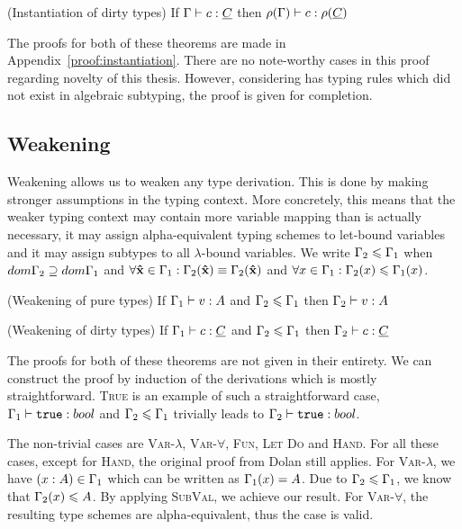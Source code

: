 \begin{theorem}
\label{thm:instantiation:drty}
(Instantiation of dirty types) If $\Gamma \vdash c \mathrel{:} \underline{C}$ then $\rho(\Gamma) \vdash c \mathrel{:} \rho(\underline{C})$
\end{theorem}
The proofs for both of these theorems are made in Appendix~\ref{proof:instantiation}. There are no note-worthy cases in this proof regarding novelty of this thesis. However, considering \core has typing rules which did not exist in algebraic subtyping, the proof is given for completion.

\subsection{Weakening}
Weakening allows us to weaken any type derivation. This is done by making stronger assumptions in the typing context. More concretely, this means that the weaker typing context may contain more variable mapping than is actually necessary, it may assign alpha-equivalent typing schemes to let-bound variables and it may assign subtypes to all $\lambda$-bound variables. We write $\Gamma_2 \leqslant \Gamma_1$ when $dom \Gamma_2 \supseteq dom \Gamma_1$ and $\forall \textbf{\^{x}} \in \Gamma_1: \Gamma_2(\textbf{\^{x}}) \equiv \Gamma_2(\textbf{\^{x}})$ and $\forall x \in \Gamma_1: \Gamma_2(x) \leqslant \Gamma_1(x)$.

\begin{theorem}
\label{thm:weakening:pure}
(Weakening of pure types) If $\Gamma_1 \vdash v \mathrel{:} A$ and $\Gamma_2 \leqslant \Gamma_1$ then $\Gamma_2 \vdash v \mathrel{:} A$
\end{theorem}

\begin{theorem}
\label{thm:weakening:drty}
(Weakening of dirty types) If $\Gamma_1 \vdash c \mathrel{:} \underline{C}$ and $\Gamma_2 \leqslant \Gamma_1$ then $\Gamma_2 \vdash c \mathrel{:} \underline{C}$
\end{theorem}

The proofs for both of these theorems are not given in their entirety. We can construct the proof by induction of the derivations which is mostly straightforward. \textsc{True} is an example of such a straightforward case, $\Gamma_1 \vdash \mathtt{true} \mathrel{:} bool$ and $\Gamma_2 \leqslant \Gamma_1$ trivially leads to $\Gamma_2 \vdash \mathtt{true} \mathrel{:} bool$. 

The non-trivial cases are \textsc{Var-$\lambda$}, \textsc{Var-$\forall$}, \textsc{Fun}, \textsc{Let} \textsc{Do} and \textsc{Hand}. For all these cases, except for \textsc{Hand}, the original proof from Dolan still applies. For \textsc{Var-$\lambda$}, we have $(x : A) \in \Gamma_1$ which can be written as $\Gamma_1(x) = A$. Due to $\Gamma_2 \leqslant \Gamma_1$, we know that $\Gamma_2(x) \leqslant A$. By applying \textsc{SubVal}, we achieve our result. For \textsc{Var-$\forall$}, the resulting type schemes are alpha-equivalent, thus the case is valid. 

